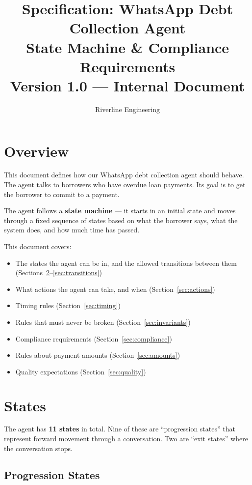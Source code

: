 \documentclass[11pt, a4paper]{article}
\title{%
  \vspace{-1cm}
  \textbf{Specification: WhatsApp Debt Collection Agent} \\[0.3cm]
  \large State Machine \& Compliance Requirements \\[0.2cm]
  \normalsize Version 1.0 --- Internal Document
}
\author{Riverline Engineering}
\date{}
\begin{document}
\maketitle
\thispagestyle{fancy}

\section{Overview}

This document defines how our WhatsApp debt collection agent should behave. The agent talks to borrowers who have overdue loan payments. Its goal is to get the borrower to commit to a payment.

The agent follows a \textbf{state machine} --- it starts in an initial state and moves through a fixed sequence of states based on what the borrower says, what the system does, and how much time has passed.

This document covers:
\begin{itemize}[nosep]
  \item The states the agent can be in, and the allowed transitions between them (Sections~\ref{sec:states}--\ref{sec:transitions})
  \item What actions the agent can take, and when (Section~\ref{sec:actions})
  \item Timing rules (Section~\ref{sec:timing})
  \item Rules that must never be broken (Section~\ref{sec:invariants})
  \item Compliance requirements (Section~\ref{sec:compliance})
  \item Rules about payment amounts (Section~\ref{sec:amounts})
  \item Quality expectations (Section~\ref{sec:quality})
\end{itemize}

\section{States}
\label{sec:states}

The agent has \textbf{11 states} in total. Nine of these are ``progression states'' that represent forward movement through a conversation. Two are ``exit states'' where the conversation stops.

\subsection{Progression States}
\end{document}
